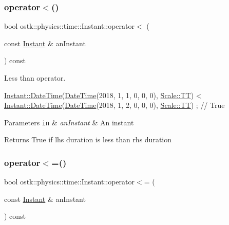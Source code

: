 \subsubsection{\texorpdfstring{operator$<$()}{operator<()}}
{\footnotesize\ttfamily bool ostk\+::physics\+::time\+::\+Instant\+::operator$<$ (\begin{DoxyParamCaption}\item[{const \hyperlink{classostk_1_1physics_1_1time_1_1_instant}{Instant} \&}]{an\+Instant }\end{DoxyParamCaption}) const}



Less than operator. 


\begin{DoxyCode}
\hyperlink{classostk_1_1physics_1_1time_1_1_instant_afd5725574a02389b80fad4baff313c8a}{Instant::DateTime}(\hyperlink{classostk_1_1physics_1_1time_1_1_instant_afd5725574a02389b80fad4baff313c8a}{DateTime}(2018, 1, 1, 0, 0, 0), 
      \hyperlink{namespaceostk_1_1physics_1_1time_adf23d37bd8641fb76a0e98ab46a70df7adf1f3edb9115acb0a1e04209b7a9937b}{Scale::TT}) < \hyperlink{classostk_1_1physics_1_1time_1_1_instant_afd5725574a02389b80fad4baff313c8a}{Instant::DateTime}(\hyperlink{classostk_1_1physics_1_1time_1_1_instant_afd5725574a02389b80fad4baff313c8a}{DateTime}(2018, 1, 2, 0, 0, 0), 
      \hyperlink{namespaceostk_1_1physics_1_1time_adf23d37bd8641fb76a0e98ab46a70df7adf1f3edb9115acb0a1e04209b7a9937b}{Scale::TT}) ; \textcolor{comment}{// True}
\end{DoxyCode}



\begin{DoxyParams}[1]{Parameters}
\mbox{\tt in}  & {\em an\+Instant} & An instant \\
\hline
\end{DoxyParams}
\begin{DoxyReturn}{Returns}
True if lhs duration is less than rhs duration 
\end{DoxyReturn}
\mbox{\label{classostk_1_1physics_1_1time_1_1_instant_a6c9a495ac6041a46602def3c0eaaef33}} 
\subsubsection{\texorpdfstring{operator$<$=()}{operator<=()}}
{\footnotesize\ttfamily bool ostk\+::physics\+::time\+::\+Instant\+::operator$<$= (\begin{DoxyParamCaption}\item[{const \hyperlink{classostk_1_1physics_1_1time_1_1_instant}{Instant} \&}]{an\+Instant }\end{DoxyParamCaption}) const}



